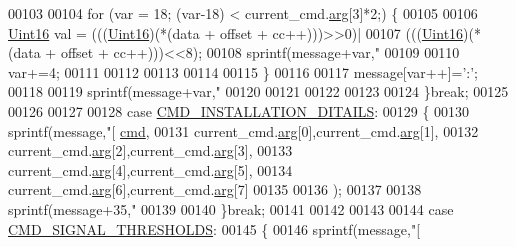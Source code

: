 \begin{DoxyCode}
{{{{{00103 
00104        \textcolor{keywordflow}{for} (var = 18; (var-18) < current\_cmd.\hyperlink{a00004_a56e6c2d7315d0ae60a51e8b140c9cfe4}{arg}[3]*2;) \{
00105 
00106           \hyperlink{a00004_aae7407b021d43f7193a81a58cfb3e297}{Uint16} val = (((\hyperlink{a00004_aae7407b021d43f7193a81a58cfb3e297}{Uint16})(*(data + offset + cc++)))>>0)|
00107                   (((\hyperlink{a00004_aae7407b021d43f7193a81a58cfb3e297}{Uint16})(*(data + offset + cc++)))<<8);
00108           sprintf(message+var,\textcolor{stringliteral}{"%
00109 
00110           var+=4;
00111 
00112 
00113 
00114 
00115        \}
00116 
00117        message[var++]=\textcolor{charliteral}{':'};
00118 
00119        sprintf(message+var,\textcolor{stringliteral}{"%
00120 
00121 
00122 
00123 
00124        \}\textcolor{keywordflow}{break};
00125 
00126 
00127 
00128        \textcolor{keywordflow}{case} \hyperlink{a00086_af91ff280feea1f52e3bdd7f0f556d153}{CMD\_INSTALLATION\_DITAILS}:
00129        \{
00130        sprintf(message,\textcolor{stringliteral}{"[%
      \hyperlink{a00004_af20664dc9ca2b752c73d524edee0e07a}{cmd},
00131                                     current\_cmd.\hyperlink{a00004_a56e6c2d7315d0ae60a51e8b140c9cfe4}{arg}[0],current\_cmd.\hyperlink{a00004_a56e6c2d7315d0ae60a51e8b140c9cfe4}{arg}[1],
00132                                     current\_cmd.\hyperlink{a00004_a56e6c2d7315d0ae60a51e8b140c9cfe4}{arg}[2],current\_cmd.\hyperlink{a00004_a56e6c2d7315d0ae60a51e8b140c9cfe4}{arg}[3],
00133                                     current\_cmd.\hyperlink{a00004_a56e6c2d7315d0ae60a51e8b140c9cfe4}{arg}[4],current\_cmd.\hyperlink{a00004_a56e6c2d7315d0ae60a51e8b140c9cfe4}{arg}[5],
00134                                     current\_cmd.\hyperlink{a00004_a56e6c2d7315d0ae60a51e8b140c9cfe4}{arg}[6],current\_cmd.\hyperlink{a00004_a56e6c2d7315d0ae60a51e8b140c9cfe4}{arg}[7]
00135 
00136                                     );
00137 
00138        sprintf(message+35,\textcolor{stringliteral}{"%
00139 
00140        \}\textcolor{keywordflow}{break};
00141 
00142 
00143 
00144        \textcolor{keywordflow}{case} \hyperlink{a00086_ac361dc1b32c1036394be0fd7de1182ca}{CMD\_SIGNAL\_THRESHOLDS}:
00145        \{
00146        sprintf(message,\textcolor{stringliteral}{"[%
}}}}}}}}}}
\end{DoxyCode}

